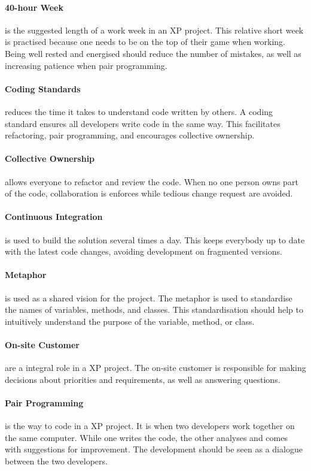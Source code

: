 \paragraph{40-hour Week} is the suggested length of a work week in an XP project.
This relative short week is practised because one needs to be on the top of their game when working.
Being well rested and energised should reduce the number of mistakes, as well as increasing patience when pair programming.

\paragraph{Coding Standards} reduces the time it takes to understand code written by others.
A coding standard ensures all developers write code in the same way.
This facilitates refactoring, pair programming, and encourages collective ownership.

\paragraph{Collective Ownership} allows everyone to refactor and review the code.
When no one person owns part of the code, collaboration is enforces while tedious change request are avoided.

\paragraph{Continuous Integration} is used to build the solution several times a day.
This keeps everybody up to date with the latest code changes, avoiding development on fragmented versions.

\paragraph{Metaphor} is used as a shared vision for the project.
The metaphor is used to standardise the names of variables, methods, and classes. 
This standardisation should help to intuitively understand the purpose of the variable, method, or class.

\paragraph{On-site Customer} are a integral role in a XP project.
The on-site customer is responsible for making decisions about priorities and requirements, as well as answering questions.

\paragraph{Pair Programming} is the way to code in a XP project.
It is when two developers work together on the same computer.
While one writes the code, the other analyses and comes with suggestions for improvement.
The development should be seen as a dialogue between the two developers.

